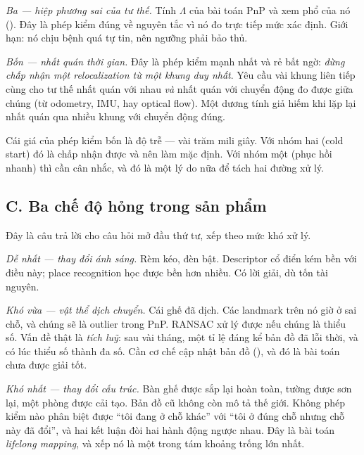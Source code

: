 \documentclass[../../vslam.tex]{subfiles}
\begin{document}
\emph{Ba --- hiệp phương sai của tư thế.} Tính \(\Lambda\) của bài toán PnP và xem phổ của nó (). Đây là phép kiểm đúng về nguyên tắc vì nó đo trực tiếp mức xác định. Giới hạn: nó chịu bệnh quá tự tin, nên ngưỡng phải bảo thủ.

\emph{Bốn --- nhất quán thời gian.} Đây là phép kiểm mạnh nhất và rẻ bất ngờ: \emph{đừng chấp nhận một relocalization từ một khung duy nhất}. Yêu cầu vài khung liên tiếp cùng cho tư thế nhất quán với nhau \emph{và} nhất quán với chuyển động đo được giữa chúng (từ odometry, IMU, hay optical flow). Một dương tính giả hiếm khi lặp lại nhất quán qua nhiều khung với chuyển động đúng.

Cái giá của phép kiểm bốn là độ trễ --- vài trăm mili giây. Với nhóm hai (cold start) đó là chấp nhận được và nên làm mặc định. Với nhóm một (phục hồi nhanh) thì cần cân nhắc, và đó là một lý do nữa để tách hai đường xử lý.

\subsection{C. Ba chế độ hỏng trong sản phẩm}

Đây là câu trả lời cho câu hỏi mở đầu thứ tư, xếp theo mức khó xử lý.

\emph{Dễ nhất --- thay đổi ánh sáng.} Rèm kéo, đèn bật. Descriptor cổ điển kém bền với điều này; place recognition học được bền hơn nhiều. Có lời giải, dù tốn tài nguyên.

\emph{Khó vừa --- vật thể dịch chuyển.} Cái ghế đã dịch. Các landmark trên nó giờ ở sai chỗ, và chúng sẽ là outlier trong PnP. RANSAC xử lý được nếu chúng là thiểu số. Vấn đề thật là \emph{tích luỹ}: sau vài tháng, một tỉ lệ đáng kể bản đồ đã lỗi thời, và có lúc thiểu số thành đa số. Cần cơ chế cập nhật bản đồ (), và đó là bài toán chưa được giải tốt.

\emph{Khó nhất --- thay đổi cấu trúc.} Bàn ghế được sắp lại hoàn toàn, tường được sơn lại, một phòng được cải tạo. Bản đồ cũ không còn mô tả thế giới. Không phép kiểm nào phân biệt được ``tôi đang ở chỗ khác'' với ``tôi ở đúng chỗ nhưng chỗ này đã đổi'', và hai kết luận đòi hai hành động ngược nhau. Đây là bài toán \emph{lifelong mapping}, và  xếp nó là một trong tám khoảng trống lớn nhất.
\end{document}
